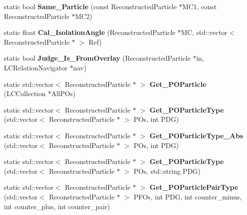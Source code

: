 \begin{DoxyCompactItemize}
\item 
\hypertarget{classToolSet_1_1CRC_a358ee6636901b5a552783d4fd9dfeec9}{
static bool {\bfseries Same\_\-Particle} (const ReconstructedParticle $\ast$MC1, const ReconstructedParticle $\ast$MC2)}
\label{classToolSet_1_1CRC_a358ee6636901b5a552783d4fd9dfeec9}

\item 
\hypertarget{classToolSet_1_1CRC_a989702a8b052f85fdcf83b8094f4be46}{
static float {\bfseries Cal\_\-IsolationAngle} (ReconstructedParticle $\ast$MC, std::vector$<$ ReconstructedParticle $\ast$ $>$ Ref)}
\label{classToolSet_1_1CRC_a989702a8b052f85fdcf83b8094f4be46}

\item 
\hypertarget{classToolSet_1_1CRC_a3f2e8fcac0ebafa986567bd8c14f5656}{
static bool {\bfseries Judge\_\-Is\_\-FromOverlay} (ReconstructedParticle $\ast$in, LCRelationNavigator $\ast$nav)}
\label{classToolSet_1_1CRC_a3f2e8fcac0ebafa986567bd8c14f5656}

\item 
\hypertarget{classToolSet_1_1CRC_acc5d3da66cadce82d9981f5b24a1c91a}{
static std::vector$<$ ReconstructedParticle $\ast$ $>$ {\bfseries Get\_\-POParticle} (LCCollection $\ast$AllPOs)}
\label{classToolSet_1_1CRC_acc5d3da66cadce82d9981f5b24a1c91a}

\item 
\hypertarget{classToolSet_1_1CRC_ad8b6c46ab37661892183c313d5c0b3b3}{
static std::vector$<$ ReconstructedParticle $\ast$ $>$ {\bfseries Get\_\-POParticleType} (std::vector$<$ ReconstructedParticle $\ast$ $>$ POs, int PDG)}
\label{classToolSet_1_1CRC_ad8b6c46ab37661892183c313d5c0b3b3}

\item 
\hypertarget{classToolSet_1_1CRC_ad0f9459b95ec7aae88c527b360cbcc3c}{
static std::vector$<$ ReconstructedParticle $\ast$ $>$ {\bfseries Get\_\-POParticleType\_\-Abs} (std::vector$<$ ReconstructedParticle $\ast$ $>$ POs, int PDG)}
\label{classToolSet_1_1CRC_ad0f9459b95ec7aae88c527b360cbcc3c}

\item 
\hypertarget{classToolSet_1_1CRC_a6250a525d48e3828cdc6d1544b3f7000}{
static std::vector$<$ ReconstructedParticle $\ast$ $>$ {\bfseries Get\_\-POParticleType} (std::vector$<$ ReconstructedParticle $\ast$ $>$ POs, std::string PDG)}
\label{classToolSet_1_1CRC_a6250a525d48e3828cdc6d1544b3f7000}

\item 
\hypertarget{classToolSet_1_1CRC_a96994e73dab779eafcc3d6a0eb7a8d5f}{
static std::vector$<$ ReconstructedParticle $\ast$ $>$ {\bfseries Get\_\-POParticlePairType} (std::vector$<$ ReconstructedParticle $\ast$ $>$ PFOs, int PDG, int counter\_\-minus, int counter\_\-plus, int counter\_\-pair)}
\label{classToolSet_1_1CRC_a96994e73dab779eafcc3d6a0eb7a8d5f}


\end{DoxyCompactItemize}
